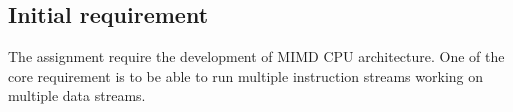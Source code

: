 \subsection {Initial requirement}
The assignment require the development of MIMD CPU architecture.
One of the core requirement is to be able to run multiple instruction streams working on multiple data streams.
